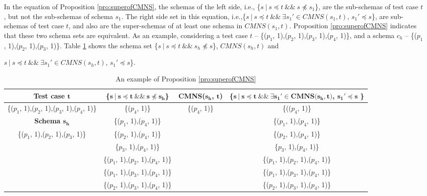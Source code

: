 In the equation of Proposition \ref{pro:superofCMNS}, the schemas of the left side, i.e., \{$s\ |\ s \preceq t\ \&\&\ s \npreceq s_{1}$\}, are the sub-schemas of test case $t$, but not the sub-schemas of schema $s_{1}$. The right side set in this equation, i.e.,\{$ s\ |\ s \preceq t \  \&\& \ \exists s_{1}' \in CMNS(s_{1}, t)$, $s_{1}' \preceq s$\}, are sub-schemas of test case $t$, and also are the super-schemas of at least one schema in $CMNS(s_{1}, t)$. Proposition \ref{pro:superofCMNS} indicates that these two schema sets are equivalent. As an example, considering a test case $t$ -- \{($p_{1}$, 1),($p_{2}$, 1),($p_{3}$, 1),($p_{4}$, 1)\}, and a schema $c_{h}$ --  \{($p_{1}$, 1),($p_{2}$, 1),($p_{3}$, 1)\}. Table \ref{examleOfCMNSPro} shows the schema set  \{$s\ |\ s \preceq t\ \&\&\ s_{h} \npreceq s$\}, $CMNS(s_{h}, t)$ and {$ s\ |\ s \preceq t\ \&\& \ \exists s_{1}' \in CMNS(s_{h}, t)$, $s_{1}' \preceq s$\}.

\begin{table}[ht]
  \centering
  \setlength{\tabcolsep}{2pt}
  \caption{An example of Proposition \ref{pro:superofCMNS}}
  {\footnotesize
    \begin{tabular}{|c|c|c|c|}
    \hline
  \textbf{  Test case $\textbf{t}$} & \textbf{ \{$\textbf{s}\ |\ \textbf{s} \preceq \textbf{t}\ \&\&\ \textbf{s} \npreceq \textbf{s}_{\textbf{h}}$\} }& \textbf{ CMNS($\textbf{s}_{\textbf{h}}$, $\textbf{t}$)} & \textbf{\{$ \textbf{s}\ |\ \textbf{s} \preceq \textbf{t} \ \&\& \ \exists \textbf{s}_{\textbf{1}}' \in \textbf{CMNS}\textbf{(}\textbf{s}_{\textbf{h}}, \textbf{t}\textbf{)}$, $  \textbf{s}_{\textbf{1}}' \preceq \textbf{s}$ \}}\\\hline
    \{($p_{1}$, 1),($p_{2}$, 1),($p_{3}$, 1),($p_{4}$, 1)\}  & \{($p_{4}$, 1)\} & \{($p_{4}$, 1)\} & \{(($p_{4}$, 1)\}\\ \cline{1-1}
      \textbf{Schema $\textbf{s}_{\textbf{h}}$}  & \{($p_{1}$, 1),($p_{4}$, 1)\} &  & \{($p_{1}$, 1),($p_{4}$, 1)\} \\\cline{1-1}
     \{($p_{1}$, 1),($p_{2}$, 1),($p_{3}$, 1)\}         &\{($p_{2}$, 1),($p_{4}$, 1)\}  &  & \{($p_{2}$, 1),($p_{4}$, 1)\}  \\
                         &\{$p_{3}$, 1),($p_{4}$, 1)\}   &  & \{$p_{3}$, 1),($p_{4}$, 1)\}  \\
                         &\{($p_{1}$, 1),($p_{2}$, 1),($p_{4}$, 1)\}   &  & \{($p_{1}$, 1),($p_{2}$, 1),($p_{4}$, 1)\}  \\
                         &\{($p_{1}$, 1),($p_{3}$, 1),($p_{4}$, 1)\}  &  & \{($p_{1}$, 1),($p_{3}$, 1),($p_{4}$, 1)\}  \\
                         &\{($p_{2}$, 1),($p_{3}$, 1),($p_{4}$, 1)\}  &  & \{($p_{2}$, 1),($p_{3}$, 1),($p_{4}$, 1)\}  \\ \hline
    \end{tabular}}%
  \label{examleOfCMNSPro}%
\end{table}%


}
